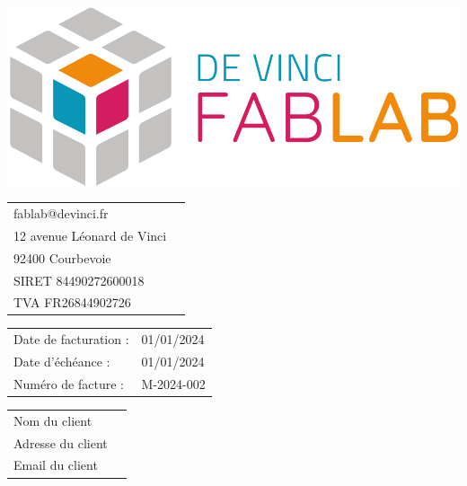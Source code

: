 \documentclass[12pt,a4paper]{article}
\begin{document}
\thispagestyle{empty}

\begin{minipage}{0.39\textwidth}
    \includegraphics[width=0.6\linewidth]{../assets/logo_fablab.png}

    \vspace{0.5cm}

    \begin{tabular}{ll}
        fablab@devinci.fr          \\
        12 avenue Léonard de Vinci \\
        92400 Courbevoie           \\
        SIRET 84490272600018       \\
        TVA  FR26844902726         \\
    \end{tabular}
\end{minipage}
\begin{minipage}{0.6\textwidth}
    \begin{flushright}
        \begin{tabular}{ll}
            Date de facturation : & 01/01/2024 \\
            Date d'échéance :     & 01/01/2024 \\
            Numéro de facture :   & M-2024-002 \\
        \end{tabular}
    \end{flushright}
\end{minipage}
\begin{flushright}
    \begin{minipage}[t]{0.5\textwidth}
        \begin{framed}
            \begin{tabular}{ll}
                Nom du client     \\
                Adresse du client \\
                Email du client   \\
            \end{tabular}
        \end{framed}
    \end{minipage}
\end{flushright}
\end{document}
